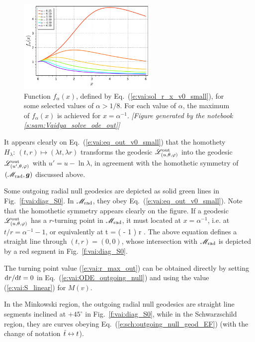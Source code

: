 \begin{figure}
\centerline{\includegraphics[width=0.6\textwidth]{vai_f_alpha_x.pdf}}
\caption[]{\label{f:vai:f_alpha_x} \footnotesize
Function $f_\alpha(x)$, defined by Eq.~(\ref{e:vai:sol_r_x_v0_small}),
for some selected values of $\alpha > 1/8$. For each value of $\alpha$, the maximum
of $f_\alpha(x)$ is achieved for $x=\alpha^{-1}$.
\textsl{[Figure generated by the notebook \ref{s:sam:Vaidya_solve_ode_out}]}
}
\end{figure}

It appears clearly on Eq.~(\ref{e:vai:eq_out_v0_small}) that
the homothety $H_\lambda:\ (t, r) \mapsto (\lambda t, \lambda r)$
transforms the geodesic $\mathscr{L}_{(u,\theta,\varphi)}^{\rm out}$  into the geodesic
$\mathscr{L}_{(u',\theta,\varphi)}^{\rm out}$ with $u' = u - \ln \lambda$,
in agreement with the homothetic symmetry of $(\mathscr{M}_{\rm rad}, \bm{g})$ discussed
above.

Some outgoing radial null geodesics are depicted as solid green lines
in Fig.~\ref{f:vai:diag_S0}. In $\mathscr{M}_{\rm rad}$, they obey
Eq.~(\ref{e:vai:eq_out_v0_small}).
Note that the homothetic symmetry appears clearly on the figure.
If a geodesic $\mathscr{L}_{(u,\theta,\varphi)}^{\rm out}$  has a $r$-turning point in $\mathscr{M}_{\rm rad}$,
it must located at $x = \alpha^{-1}$, i.e. at $t/r = \alpha^{-1} - 1$,
or equivalently at
\be \label{e:vai:r_max_out}
  t = \left(  - 1 \right) r .
\ee
The above equation defines a straight line through $(t,r) = (0,0)$,
whose intersection with $\mathscr{M}_{\rm rad}$ is depicted by a red segment
in Fig.~\ref{f:vai:diag_S0}.
\begin{remark}
The turning point value (\ref{e:vai:r_max_out}) can be obtained
directly by setting $\mathrm{d} r / \mathrm{d} t = 0$ in Eq.~(\ref{e:vai:ODE_outgoing_null})
and using the value (\ref{e:vai:S_linear}) for $M(v)$.
\end{remark}

In the Minkowski region, the outgoing radial null geodesics are straight line
segments inclined at $+45^\circ$ in Fig.~\ref{f:vai:diag_S0}, while
in the Schwarzschild region, they are curves obeying Eq.~(\ref{e:sch:outgoing_null_geod_EF})
(with the change of notation ${\tilde t} \leftrightarrow t$).


